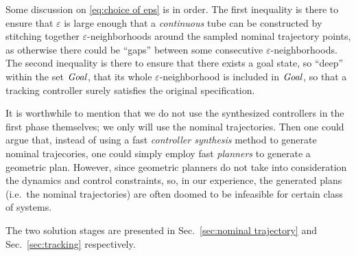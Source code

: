 Some discussion on \eqref{eq:choice of eps} is in order.
The first inequality is there to ensure that $\varepsilon$ is large enough that a \emph{continuous} tube can be constructed by stitching together $\varepsilon$-neighborhoods around the sampled nominal trajectory points, as otherwise there could be ``gaps'' between some consecutive $\varepsilon$-neighborhoods.
The second inequality is there to ensure that there exists a goal state, so ``deep'' within the set $\mathit{Goal}$, that its whole $\varepsilon$-neighborhood is included in $\mathit{Goal}$, so that a tracking controller surely satisfies the original specification.

It is worthwhile to mention that we do not use the synthesized controllers in the first phase themselves; we only will use the nominal trajectories.
Then one could argue that, instead of using a fast \emph{controller synthesis} method to generate nominal trajecories, one could simply employ fast \emph{planners} \cite{rrt etc.} to generate a geometric plan.
However, since geometric planners do not take into consideration the dynamics and control constraints, so, in our experience, the generated plans (i.e.\ the nominal trajectories) are often doomed to be infeasible for certain class of systems.

The two solution stages are presented in Sec.~\ref{sec:nominal trajectory} and Sec.~\ref{sec:tracking} respectively.







